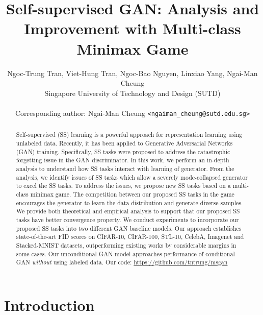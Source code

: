 \documentclass{article}
\title{Self-supervised GAN: Analysis and Improvement with Multi-class Minimax Game}
\author{Ngoc-Trung Tran, Viet-Hung Tran, Ngoc-Bao Nguyen, Linxiao Yang, Ngai-Man Cheung\\
  Singapore University of Technology and Design (SUTD)\\
  \\
  Corresponding author: Ngai-Man Cheung \texttt{<ngaiman\_cheung@sutd.edu.sg>}\\
}
\begin{document}
\maketitle

\begin{abstract}

Self-supervised (SS) learning is a powerful approach for representation learning using unlabeled data. Recently, it has been applied to Generative Adversarial Networks (GAN) training. Specifically, SS tasks were proposed to address the catastrophic forgetting issue in the GAN discriminator. In this work, we perform an in-depth analysis to understand how SS tasks interact with learning of generator. From the analysis, we identify issues of SS tasks which allow a severely mode-collapsed generator to excel the SS tasks. To address the issues, we propose new SS tasks based on a multi-class minimax game. The competition between our proposed SS tasks in the game encourages the generator to learn the data distribution and generate diverse samples. We provide both theoretical and empirical analysis to support that our proposed SS tasks have better convergence property. We conduct experiments to incorporate our proposed SS tasks into two different GAN baseline models. Our approach establishes state-of-the-art FID scores on CIFAR-10, CIFAR-100, STL-10, CelebA, Imagenet  and Stacked-MNIST datasets, outperforming existing works by considerable margins in some cases. Our unconditional GAN model approaches performance of conditional GAN {\em without} using labeled data.  Our code:  \url{https://github.com/tntrung/msgan}






\end{abstract}
 
\section{Introduction}
\end{document}
